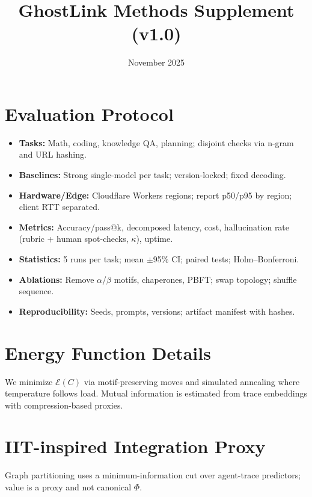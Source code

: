\documentclass[11pt]{article}
\title{GhostLink Methods Supplement (v1.0)}
\date{November 2025}
\begin{document}
\maketitle
\section*{Evaluation Protocol}
\begin{itemize}
\item \textbf{Tasks:} Math, coding, knowledge QA, planning; disjoint checks via n-gram and URL hashing.
\item \textbf{Baselines:} Strong single-model per task; version-locked; fixed decoding.
\item \textbf{Hardware/Edge:} Cloudflare Workers regions; report p50/p95 by region; client RTT separated.
\item \textbf{Metrics:} Accuracy/pass@k, decomposed latency, cost, hallucination rate (rubric + human spot-checks, $\kappa$), uptime.
\item \textbf{Statistics:} 5 runs per task; mean $\pm$95\% CI; paired tests; Holm--Bonferroni.
\item \textbf{Ablations:} Remove $\alpha$/$\beta$ motifs, chaperones, PBFT; swap topology; shuffle sequence.
\item \textbf{Reproducibility:} Seeds, prompts, versions; artifact manifest with hashes.
\end{itemize}
\section*{Energy Function Details}
We minimize $\mathcal{E}(C)$ via motif-preserving moves and simulated annealing where temperature follows load. Mutual information is estimated from trace embeddings with compression-based proxies.
\section*{IIT-inspired Integration Proxy}
Graph partitioning uses a minimum-information cut over agent-trace predictors; value is a proxy and not canonical $\Phi$.
\end{document}
